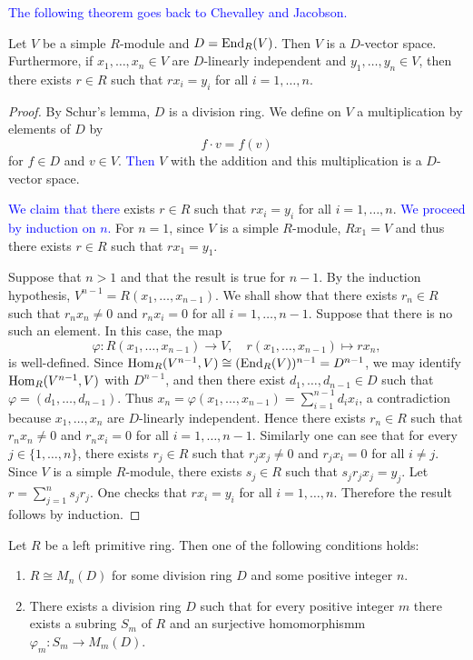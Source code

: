 \textcolor{blue}{The following theorem goes back to Chevalley and Jacobson.}

\begin{theorem}
Let $V$ be a simple $R$-module and 
$D=\operatorname{End}_R(V)$. Then $V$ is a $D$-vector space. Furthermore, if $x_1,\dots,x_n\in V$ are $D$-linearly 
independent and $y_1,\dots,y_n\in V$, then there exists $r\in R$ such that $rx_i=y_i$ for all $i=1,\dots,n$.
\end{theorem}

\begin{proof}
By Schur's lemma, $D$ is a division ring.
We define on $V$ a multiplication by elements of $D$ by 
\[
f\cdot v=f(v)
\]
for $f\in D$ and $v\in V$. \textcolor{blue}{Then} $V$ with the addition and this multiplication is a $D$-vector space.

\textcolor{blue}{We claim that there} exists $r\in R$ such that $rx_i=y_i$ for all $i=1,\dots,n$. \textcolor{blue}{We proceed by induction on $n$.}
For $n=1$, since $V$ is a simple $R$-module, $Rx_1=V$ and thus there exists $r\in R$ such that $rx_1=y_1$.

Suppose that $n>1$ and that the result is true for $n-1$.
By the induction hypothesis, $V^{n-1}=R(x_1,\dots,x_{n-1})$. We shall show that there exists $r_n\in R$ 
such that $r_nx_n\neq 0$ and $r_nx_i=0$ for all
$i=1,\dots,n-1$. Suppose that there is no such an element. In this case, 
the map 
\[
\varphi\colon R(x_1,\dots,x_{n-1})\rightarrow V,
\quad
r(x_1,\dots,x_{n-1})\mapsto rx_n, 
\]
is well-defined. Since $\operatorname{Hom}_R(V^{n-1}, V)\cong
(\operatorname{End}_R(V))^{n-1}=D^{n-1}$, we may identify
$\operatorname{Hom}_R(V^{n-1}, V)$ with $D^{n-1}$, and then there exist
$d_1,\dots,d_{n-1}\in D$ such that $\varphi =(d_1,\dots,d_{n-1})$. Thus
$x_n=\varphi (x_1,\dots,x_{n-1})=\sum_{i=1}^{n-1}d_ix_i$, a contradiction because $x_1,\dots,x_n$ are $D$-linearly independent. 
Hence there exists $r_n\in R$ such that $r_nx_n\neq 0$ and $r_nx_i=0$ for all
$i=1,\dots,n-1$. Similarly one can see that for every $j\in\{ 1,\dots,n\}$,
there exists $r_j\in R$ such that $r_jx_j\neq 0$ and $r_jx_i=0$ for all
$i\neq j$. Since  $V$ is a simple $R$-module, there exists $s_j\in R$
such that $s_jr_jx_j=y_j$. Let $r=\sum_{j=1}^ns_jr_j$. One checks that $rx_i=y_i$ for all $i=1,\dots,n$. Therefore the result follows by induction.
\end{proof}

\begin{theorem}\label{Teorema 1.2.4}
Let $R$ be a left primitive ring. Then one of the following conditions holds:
\begin{enumerate}
\item $R\cong M_n(D)$ for some division ring $D$ and some positive integer $n$.
\item There exists a division ring $D$ such that for every positive integer $m$ there exists a subring $S_m$ of $R$ and an surjective homomorphismm $\varphi _m\colon S_m\rightarrow M_m(D)$.
\end{enumerate}
\end{theorem}

